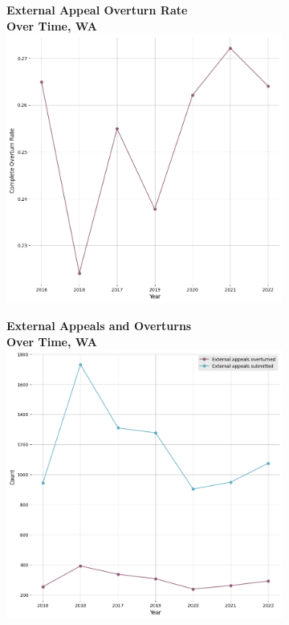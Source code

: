 \documentclass[12pt, a4paper,twoside,parskip=full]{report}
\theoremstyle{plain} %
\theoremstyle{definition} %
\theoremstyle{remark} %
\numberwithin{equation}{chapter}
\begin{document}
		
		\begin{figure}[h!]
			\centering
			\begin{subfigure}[b]{0.49\textwidth}
				\centering
				\textbf{External Appeal Overturn Rate}\\
				\textbf{Over Time, WA}\\
				\includegraphics[width=\textwidth]{images/wa_external_appeals/external_appeal_overturn_rates_by_year.png}
			\end{subfigure}
			\hfill
			\begin{subfigure}[b]{0.49\textwidth}
				\centering
				\textbf{External Appeals and Overturns}\\
				\textbf{Over Time, WA}\\
				\includegraphics[width=\textwidth]{images/wa_external_appeals/external_appeals_by_year.png}

\end{subfigure}
\end{figure}
\end{document}
